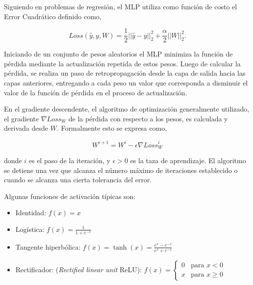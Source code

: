 \documentclass[spanish]{article}
\begin{document}
          Siguiendo en problemas de regresión, el MLP utiliza como función de costo el Error Cuadrático 
          definido como,
          
          \begin{equation}
            Loss(\hat{y},y,W) = \frac{1}{2}||\hat{y} - y ||_2^2 + \frac{\alpha}{2} ||W||_2^2.
          \end{equation}

          Iniciando de un conjunto de pesos aleatorios el MLP minimiza la función de pérdida mediante 
          la actualización repetida de estos pesos. Luego de calcular la pérdida, se realiza un paso de 
          retropropagación desde la capa de salida hacia las capas anteriores, entregando a cada peso un 
          valor que corresponda a disminuir el valor de la función de pérdida en el proceso de actualización. \medskip

          En el gradiente descendente, el algoritmo de optimización generalmente utilizado, el gradiente 
          $\nabla Loss_{W}$  de la pérdida con respecto a los pesos, es calculada y derivada desde $W$. 
          Formalmente esto se expresa como,

          \begin{equation}
            W^{i+1} = W^i - \epsilon \nabla {Loss}_{W}^{i}
          \end{equation}
              
          donde $i$ es el paso de la iteración, y $\epsilon > 0$ es la taza de aprendizaje. El algoritmo 
          se detiene una vez que alcanza el número máximo de iteraciones establecido o cuando se alcanza 
          una cierta tolerancia del error. \medskip
          
          Algunas funciones de activación típicas son:
          \begin{itemize}
            \item Identidad: $f(x)=x$
            \item Logística: $f(x)=\frac{1}{1+e^{-x}}$
            \item Tangente hiperbólica: $f(x)=\tanh(x)=\frac{e^x - e^{-x}}{e^x + e^{-x}}$
            \item Rectificador: (\emph{Rectified linear unit} ReLU): 
              $f(x)=\begin{cases} 0 & \text{para } x < 0 \\ x & \text{para } x \geq 0 \end{cases}$ 
          \end{itemize}
              
\end{document}
